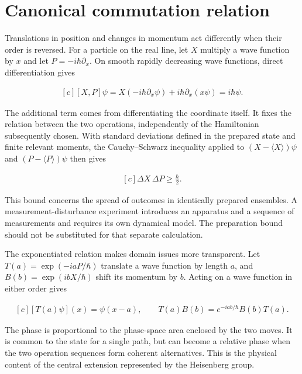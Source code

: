 \documentclass[11pt,oneside]{book}
\newenvironment{centeredalign}{\[\begin{gathered}[c]}{\end{gathered}\]}
\begin{document}
\clearpage

\section{Canonical commutation relation}

\label{topic:canonical-commutation-relation}

Translations in position and changes in momentum act differently when their order is reversed. For a particle on the real line, let \(X\) multiply a wave function by \(x\) and let \(P=-i\hbar\partial_x\). On smooth rapidly decreasing wave functions, direct differentiation gives

\begin{centeredalign}
[X,P]\psi=X(-i\hbar\partial_x\psi)+i\hbar\partial_x(x\psi)
=i\hbar\psi.
\end{centeredalign}

The additional term comes from differentiating the coordinate itself. It fixes the relation between the two operations, independently of the Hamiltonian subsequently chosen. With standard deviations defined in the prepared state and finite relevant moments, the Cauchy--Schwarz inequality applied to \((X-\langle X\rangle)\psi\) and \((P-\langle P\rangle)\psi\) then gives

\begin{centeredalign}
\Delta X\,\Delta P\geq\frac{\hbar}{2}.
\end{centeredalign}

This bound concerns the spread of outcomes in identically prepared ensembles. A measurement-disturbance experiment introduces an apparatus and a sequence of measurements and requires its own dynamical model. The preparation bound should not be substituted for that separate calculation.

The exponentiated relation makes domain issues more transparent. Let \(T(a)=\exp(-iaP/\hbar)\) translate a wave function by length \(a\), and \(B(b)=\exp(ibX/\hbar)\) shift its momentum by \(b\). Acting on a wave function in either order gives

\begin{centeredalign}
[T(a)\psi](x)=\psi(x-a),\qquad
T(a)B(b)=e^{-iab/\hbar}B(b)T(a).
\end{centeredalign}

The phase is proportional to the phase-space area enclosed by the two moves. It is common to the state for a single path, but can become a relative phase when the two operation sequences form coherent alternatives. This is the physical content of the central extension represented by the Heisenberg group.
\end{document}

